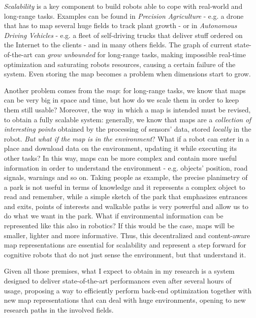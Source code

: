 \documentclass[10pt,a4paper, notitlepage]{report}
\begin{document}
\textit{Scalability} is a key component to build robots able to cope with real-world and long-range tasks. Examples can be found in \textit{Precision Agriculture} - e.g. a drone that has to map several huge fields to track plant growth - or in \textit{Autonomous Driving Vehicles} - e.g. a fleet of self-driving trucks that deliver stuff ordered on the Internet to the clients - and in many others fields. The graph of current state-of-the-art can \textit{grow unbounded} for long-range tasks, making impossible real-time optimization and saturating robots resources, causing a certain failure of the system. Even storing the map becomes a problem when dimensions start to grow.

Another problem comes from the \textit{map}: for long-range tasks, we know that maps can be very big in space and time, but how do we scale them in order to keep them still usable? Moreover, the way in which a map is intended must be revised, to obtain a fully scalable system: generally, we know that maps are a \textit{collection of interesting points} obtained by the processing of sensors' data, stored \textit{locally} in the robot. \textit{But what if the map is in the environment}? What if a robot can enter in a place and download data on the environment, updating it while executing its other tasks? In this way, maps can be more complex and contain more useful information in order to understand the environment - e.g. objects' position, road signals, warnings and so on. Taking people as example, the precise planimetry of a park is not useful in terms of knowledge and it represents a complex object to read and remember, while a simple sketch of the park that emphasizes entrances and exits, points of interests and walkable paths is very powerful and allow us to do what we want in the park. What if environmental information can be represented like this also in robotics? If this would be the case, maps will be smaller, lighter and more informative. Thus, this decentralized and content-aware map representations are essential for scalability and represent a step forward for cognitive robots that do not just sense the environment, but that understand it. 

\vspace{10px}

Given all those premises, what I expect to obtain in my research is a system designed to deliver state-of-the-art performances even after several hours of usage, proposing a way to efficiently perform back-end optimization together with new map representations that can deal with huge environments, opening to new research paths in the involved fields.
\end{document}

